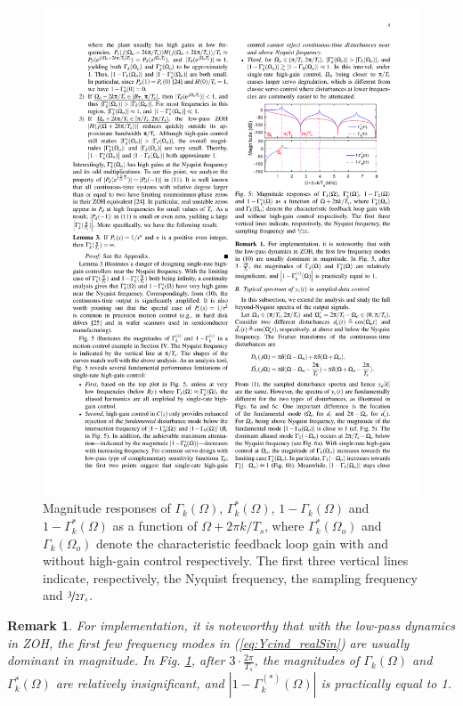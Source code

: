 \documentclass [11pt, proquest] {uwthesis}[2020/02/24]
\newtheorem{remark}{Remark}
\begin{document}
\begin{itemize}
\begin{figure}[!ht]
\begin{centering}
\includegraphics[width=13cm]{Spectral-analysis/FIG5.pdf}
\par\end{centering}
\caption{\label{fig:the-first-three}Magnitude responses of $\Gamma_{k}(\Omega)$,
$\Gamma_{k}^{*}(\Omega)$, $1-\Gamma_{k}(\Omega)$ and $1-\Gamma_{k}^{*}(\Omega)$
as a function of $\Omega+2\pi k/T_{s}$, where $\Gamma_{k}^{*}(\Omega_{o})$
and $\Gamma_{k}(\Omega_{o})$ denote the characteristic feedback loop
gain with and without high-gain control respectively. The first three
vertical lines indicate, respectively, the Nyquist frequency, the
sampling frequency and $\nicefrac{3}{2T_{s}}$.}
\end{figure}
\end{itemize}
\begin{remark}For implementation, it is noteworthy that with the
low-pass dynamics in ZOH, the first few frequency modes in (\ref{eq:Ycind_realSin})
are usually dominant in magnitude. In Fig. \ref{fig:the-first-three},
after $3\cdot\frac{2\pi}{T_{s}}$, the magnitudes of $\Gamma_{k}(\Omega)$
and $\Gamma_{k}^{*}(\Omega)$ are relatively insignificant, and $\left|1-\Gamma_{k}^{(*)}(\Omega)\right|$
is practically equal to 1.\end{remark}
\end{document}
